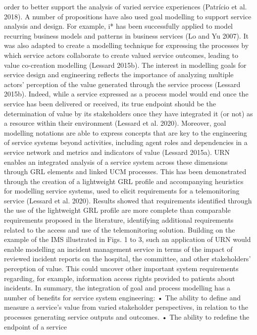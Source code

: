 order to better support the analysis of varied service experiences (Patrício et al. 2018). A number
of propositions have also used goal modelling to
support service analysis and design. For example,
i* has been successfully applied to model recurring business models and patterns in business
services (Lo and Yu 2007). It was also adapted
to create a modelling technique for expressing the
processes by which service actors collaborate to
create valued service outcomes, leading to value
co-creation modelling (Lessard 2015b).
The interest in modelling goals for service design and engineering reflects the importance of
analyzing multiple actors’ perception of the value
generated through the service process (Lessard
2015b). Indeed, while a service expressed as a
process model would end once the service has
been delivered or received, its true endpoint should
be the determination of value by its stakeholders
once they have integrated it (or not) as a resource
within their environment (Lessard et al. 2020).
Moreover, goal modelling notations are able to
express concepts that are key to the engineering of
service systems beyond activities, including agent
roles and dependencies in a service network and
metrics and indicators of value (Lessard 2015a).
URN enables an integrated analysis of a service
system across these dimensions through GRL elements and linked UCM processes. This has been
demonstrated through the creation of a lightweight
GRL profile and accompanying heuristics for
modelling service systems, used to elicit requirements for a telemonitoring service (Lessard et al.
2020). Results showed that requirements identified through the use of the lightweight GRL profile
are more complete than comparable requirements
proposed in the literature, identifying additional
requirements related to the access and use of the
telemonitoring solution. Building on the example of the IMS illustrated in Figs. 1 to 3, such an
application of URN would enable modelling an incident management service in terms of the impact
of reviewed incident reports on the hospital, the
committee, and other stakeholders’ perception of
value. This could uncover other important system
requirements regarding, for example, information
access rights provided to patients about incidents.
In summary, the integration of goal and process
modelling has a number of benefits for service
system engineering:
• The ability to define and measure a service’s
value from varied stakeholder perspectives, in
relation to the processes generating service
outputs and outcomes.
• The ability to redefine the endpoint of a service
